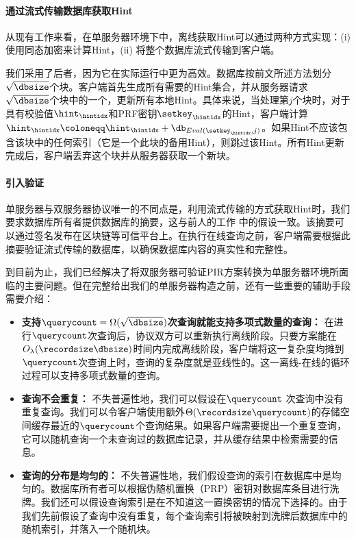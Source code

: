 \paragraph{通过流式传输数据库获取Hint}
从现有工作来看，在单服务器环境下中，离线获取Hint可以通过两种方式实现：(i)  使用同态加密来计算Hint\cite{EC:CorHenKog22}，(ii) 将整个数据库流式传输到客户端\cite{CCS:PatPerYeo18, Piano}。

我们采用了后者，因为它在实际运行中更为高效。数据库按前文所述方法划分$\sqrt{\dbsize}$个块。客户端首先生成所有需要的Hint集合，并从服务器请求$\sqrt{\dbsize}$个块中的一个，更新所有本地Hint。具体来说，当处理第$j$个块时，对于具有校验值$\hint_\hintidx$和PRF密钥$\setkey_\hintidx$的Hint，客户端计算$\hint_\hintidx \coloneqq \hint_\hintidx+\db_{Eval(\setkey_\hintidx,j)}$。如果Hint不应该包含该块中的任何索引（它是一个此块的备用Hint），则跳过该Hint。所有Hint更新完成后，客户端丢弃这个块并从服务器获取一个新块。

\paragraph{引入验证}
单服务器与双服务器协议唯一的不同点是，利用流式传输的方式获取Hint时，我们要求数据库所有者提供数据库的摘要，这与前人的工作 \cite{APIR} 中的假设一致。该摘要可以通过签名发布在区块链等可信平台上。在执行在线查询之前，客户端需要根据此摘要验证流式传输的数据库，以确保数据库内容的真实性和完整性。

到目前为止，我们已经解决了将双服务器可验证PIR方案转换为单服务器环境所面临的主要问题。但在完整给出我们的单服务器构造之前，还有一些重要的辅助手段需要介绍：
\begin{itemize}
    \item \textbf{支持$\querycount = \Omega(\sqrt{\dbsize})$次查询就能支持多项式数量的查询：} 在进行$\querycount$次查询后，协议双方可以重新执行离线阶段。只要方案能在$O_\lambda(\recordsize\dbsize)$时间内完成离线阶段，客户端将这一复杂度均摊到$\querycount$次查询上时，查询的复杂度就是亚线性的。这一离线-在线的循环过程可以支持多项式数量的查询。

    \item \textbf{查询不会重复：} 不失普遍性地，我们可以假设在$\querycount$ 次查询中没有重复查询。我们可以令客户端使用额外$\Theta(\recordsize \querycount)$的存储空间缓存最近的$\querycount$个查询结果。如果客户端需要提出一个重复查询，它可以随机查询一个未查询过的数据库记录，并从缓存结果中检索需要的信息。

    \item \textbf{查询的分布是均匀的：} 不失普遍性地，我们假设查询的索引在数据库中是均匀的。数据库所有者可以根据伪随机置换（PRP）密钥对数据库条目进行洗牌。我们还可以假设查询索引是在不知道这一置换密钥的情况下选择的。由于我们先前假设了查询中没有重复，每个查询索引将被映射到洗牌后数据库中的随机索引，并落入一个随机块。
\end{itemize}

